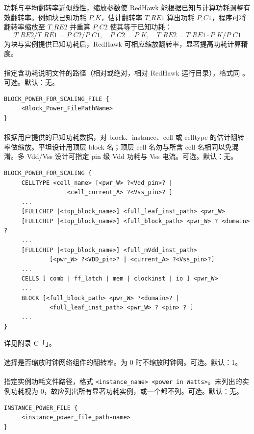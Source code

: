 功耗与平均翻转率近似线性，缩放参数使 RedHawk 能根据已知与计算功耗调整有效翻转率。例如块已知功耗 $P\_K$，估计翻转率 $T\_{RE1}$ 算出功耗 $P\_{C1}$，程序可将翻转率缩放至 $T\_{RE2}$ 并重算 $P\_{C2}$ 使其等于已知功耗：
\[
T\_{RE2}/T\_{RE1} = P\_{C2}/P\_{C1},\quad P\_{C2}=P\_K,\quad T\_{RE2} = T\_{RE1}\cdot P\_K/P\_{C1}
\]
为块与实例提供已知功耗后，RedHawk 可相应缩放翻转率，显著提高功耗计算精度。

\paragraph{}
指定含功耗说明文件的路径（相对或绝对，相对 RedHawk 运行目录），格式同 。可选。默认：无。
\begin{lstlisting}
BLOCK_POWER_FOR_SCALING_FILE {
     <Block_Power_FilePathName>
}
\end{lstlisting}

\paragraph{}
根据用户提供的已知功耗数据，对 block、instance、cell 或 celltype 的估计翻转率做缩放。平坦设计用顶层 block 名；顶层 cell 名勿与所含 cell 名相同以免混淆。多 Vdd/Vss 设计可指定 pin 级 Vdd 功耗与 Vss 电流。可选。默认：无。
\begin{lstlisting}
BLOCK_POWER_FOR_SCALING {
     CELLTYPE <cell_name> [<pwr_W> ?<Vdd_pin>? |
                  <cell_current_A> ?<Vss_pin>? ]
     ...
     [FULLCHIP |<top_block_name>] <full_leaf_inst_path> <pwr_W>
     [FULLCHIP |<top_block_name>] <full_block_path> <pwr_W> ? <domain> ?
     ...
     [FULLCHIP |<top_block_name>] <full_mVdd_inst_path>
             [<pwr_W> ?<VDD_pin>? | <current_A> ?<Vss_pin>?]
     ...
     CELLS [ comb | ff_latch | mem | clockinst | io ] <pwr_W>
     ...
     BLOCK [<full_block_path> <pwr_W> ?<domain>? |
             <full_leaf_inst_path> <pwr_W> ? <pin> ? ]
     ...
}
\end{lstlisting}
详见附录 C「」。

\paragraph{}
选择是否缩放时钟网络组件的翻转率。为 0 时不缩放时钟网。可选。默认：1。

\paragraph{}
指定实例功耗文件路径，格式 \texttt{<instance\_name> <power in Watts>}。未列出的实例功耗视为 0，故应列出所有显著功耗实例，或一个都不列。可选。默认：无。
\begin{lstlisting}
INSTANCE_POWER_FILE {
     <instance_power_file_path-name>
}
\end{lstlisting}

